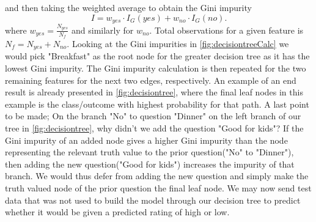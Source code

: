 and then taking the weighted average to obtain the Gini impurity
\begin{equation}
    I = w_{yes} \cdot I_G(yes) + w_{no} \cdot I_G{(no)}.
\end{equation}
where $w_{yes} = \frac{N_{yes}}{N_f}$ and similarly for $w_{no}$. Total observations for a given feature is $N_{f} = N_{yes} + N_{no}$.
Looking at the Gini impurities in \cref{fig:decisiontreeCalc} we would pick "Breakfast" as the root node for the greater decision tree as it has the lowest Gini impurity. 
The Gini impurity calculation is then repeated for the two remaining features for the next two edges, respectively. An example of an end result is already presented in \cref{fig:decisiontree}, where the final leaf nodes in this example is the class/outcome with highest probability for that path. A last point to be made; On the branch "No" to question "Dinner" on the left branch of our tree in \cref{fig:decisiontree}, why didn't we add the question "Good for kids"? If the Gini impurity of an added node gives a higher Gini impurity than the node representing the relevant truth value to the prior question("No" to "Dinner"), then adding the new question("Good for kids") increases the impurity of that branch. We would thus defer from adding the new question and simply make the truth valued node of the prior question the final leaf node. 
We may now send test data that was not used to build the model through our decision tree to predict whether it would be given a predicted rating of high or low. 

